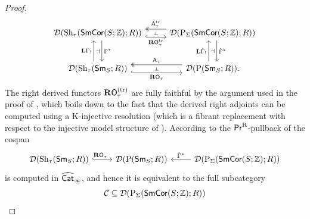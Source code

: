 \documentclass[reqno]{amsart}
\numberwithin{equation}{section}\theoremstyle{thms}
\theoremstyle{defn}
\newcommand{\nP}{\tn{P}}
\newcommand{\bZ}{\mathbb{Z}}
\newcommand{\cC}{\mathcal{C}}
\newcommand{\cD}{\mathcal{D}}
\newcommand{\tn}[1]{\textnormal{#1}}
\newcommand{\tsf}[1]{\textsf{\textup{#1}}}
\newcommand{\tbf}[1]{\textbf{\textup{#1}}}
\newcommand{\what}[1]{\widehat{#1}}
\newcommand{\prr}{\tsf{Pr}^{\tn{R}}}
\newcommand{\sms}{\tsf{Sm}_S}
\newcommand{\corsms}[1]{\tsf{SmCor}(S;#1)}
\begin{document}
\begin{proof}
\begin{equation}
\begin{tikzcd}[column sep=0.9cm,row sep=0.9cm]
	{\cD(\tn{Sh}_{\tau}(\corsms{\bZ};R))} & {\cD(\nP_{\Sigma}(\corsms{\bZ};R))} \\
	{\cD(\tn{Sh}_{\tau}(\sms;R))} & {\cD(\nP(\sms;R)).}
	\arrow[""{name=0, anchor=center, inner sep=0}, "{\tbf{R}\tsf{O}_{\tau}^{\tn{tr}}}"', hook, shift right=2, from=1-1, to=1-2]
	\arrow[""{name=1, anchor=center, inner sep=0}, "{\Gamma^*}", shift left=2, from=1-1, to=2-1]
	\arrow[""{name=2, anchor=center, inner sep=0}, "{\tsf{A}_{\tau}^{\tn{tr}}}"', two heads, shift right=2, from=1-2, to=1-1]
	\arrow[""{name=3, anchor=center, inner sep=0}, "{\hat{\Gamma}^*}", shift left=2, from=1-2, to=2-2]
	\arrow[""{name=4, anchor=center, inner sep=0}, "{\tbf{L}\Gamma_!}", shift left=2, from=2-1, to=1-1]
	\arrow[""{name=5, anchor=center, inner sep=0}, "{\tbf{R}\tsf{O}_{\tau}}"', hook, shift right=2, from=2-1, to=2-2]
	\arrow[""{name=6, anchor=center, inner sep=0}, "{\tbf{L}\hat{\Gamma}_!}", shift left=2, from=2-2, to=1-2]
	\arrow[""{name=7, anchor=center, inner sep=0}, "{\tsf{A}_{\tau}}"', two heads, shift right=2, from=2-2, to=2-1]
	\arrow["\dashv"{anchor=center, rotate=-90}, draw=none, from=2, to=0]
	\arrow["\dashv"{anchor=center}, draw=none, from=4, to=1]
	\arrow["\dashv"{anchor=center, rotate=-90}, draw=none, from=7, to=5]
	\arrow["\dashv"{anchor=center}, draw=none, from=6, to=3]
\end{tikzcd}
\end{equation}
The right derived functors $\tbf{R}\tsf{O}_{\tau}^{(\tn{tr})}$ are fully faithful by the argument used in the proof of \cite[Corollary 4.1]{ser03}, which boils down to the fact that the derived right adjoints can be computed using a K-injective resolution (which is a fibrant replacement with respect to the injective model structure of \cite[Proposition 1.3.5.3]{lur17}). According to \cite[Proposition 5.5.7.6]{lur09} the $\prr$-pullback of the cospan
\begin{equation}\label{diag:derivedcospan}
\begin{tikzcd}
	{\cD(\tn{Sh}_{\tau}(\sms;R))} & {\cD(\nP(\sms;R))} & {\cD(\nP_{\Sigma}(\corsms{\bZ};R))}
	\arrow["{\hspace*{-0.16cm}\tbf{R}\tsf{O}_{\tau}}", hook, from=1-1, to=1-2]
	\arrow["{\hat{\Gamma}^*}"', from=1-3, to=1-2]
\end{tikzcd}
\end{equation}
is computed in $\what{\tsf{Cat}}_{\infty}$, and hence it is equivalent to the full subcategory 
$$\cC \subseteq \cD(\nP_{\Sigma}(\corsms{\bZ};R))$$

\end{proof}
\end{document}
